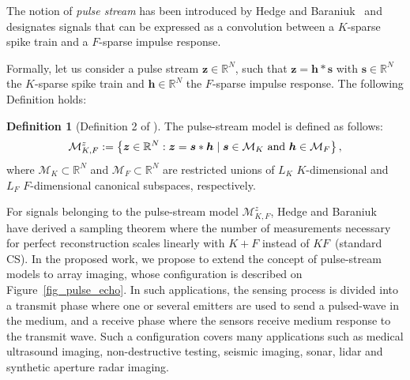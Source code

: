 \documentclass{article}
\newcommand{\etal}{\textit{et al.}}
\newcommand{\vect}[1]{\bm{#1}}
\theoremstyle{definition}
\newtheorem{defn}{Definition}
\begin{document}
The notion of \textit{pulse stream} has been introduced by Hedge and Baraniuk~\cite{Hedge_TSP_2011} and designates signals that can be expressed as a convolution between a $K$-sparse spike train and a $F$-sparse impulse response. 
%
%

Formally, let us consider a pulse stream $\vect{z} \in \mathbb{R}^N$, such that $\vect{z} = \vect{h} \ast \vect{s}$ with $\vect{s} \in \mathbb{R}^N$ the $K$-sparse spike train and $\vect{h} \in \mathbb{R}^N$ the $F$-sparse impulse response. The following Definition holds:
\begin{defn}[Definition 2 of \cite{Hedge_TSP_2011}]	
The pulse-stream model is defined as follows:
\begin{equation}
\label{eq_pulse_stream_model}
\mathcal{M}^z_{K,F}:=\left\lbrace \vect{z} \in \mathbb{R}^N: \vect{z} = \vect{s} \ast \vect{h} \; | \; \vect{s} \in \mathcal{M}_K \textnormal{ and } \vect{h} \in \mathcal{M}_F \right \rbrace,
\end{equation}
where $\mathcal{M}_K \subset \mathbb{R}^N$ and $\mathcal{M}_F \subset \mathbb{R}^N$ are restricted unions of $L_K$ $K$-dimensional and $L_F$ $F$-dimensional canonical subspaces, respectively.
\end{defn} 

For signals belonging to the pulse-stream model $\mathcal{M}^z_{K,F}$, Hedge and Baraniuk~\cite{Hedge_TSP_2011} have derived a sampling theorem where the number of measurements necessary for perfect reconstruction scales linearly with $K + F$ instead of $KF$~(standard CS). 
In the proposed work, we propose to extend the concept of pulse-stream models to array imaging, whose configuration is described on Figure~\ref{fig_pulse_echo}. 
In such applications, the sensing process is divided into a transmit phase where one or several emitters are used to send a pulsed-wave in the medium, and a receive phase where the sensors receive medium response to the transmit wave. 
Such a configuration covers many applications such as medical ultrasound imaging, non-destructive testing, seismic imaging, sonar, lidar and synthetic aperture radar imaging.
\end{document}
